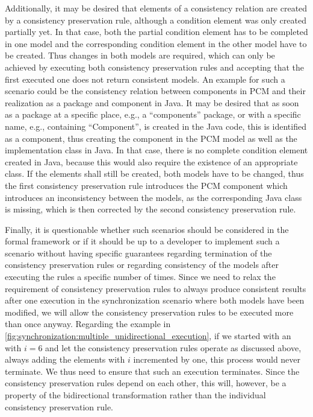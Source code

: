 Additionally, it may be desired that elements of a consistency relation are created by a consistency preservation rule, although a condition element was only created partially yet.
In that case, both the partial condition element has to be completed in one model and the corresponding condition element in the other model have to be created.
Thus changes in both models are required, which can only be achieved by executing both consistency preservation rules and accepting that the first executed one does not return consistent models.
An example for such a scenario could be the consistency relation between components in \gls{PCM} and their realization as a package and component in Java.
It may be desired that as soon as a package at a specific place, e.g., a \enquote{components} package, or with a specific name, e.g., containing \enquote{Component}, is created in the Java code, this is identified as a component, thus creating the component in the \gls{PCM} model as well as the implementation class in Java.
In that case, there is no complete condition element created in Java, because this would also require the existence of an appropriate class.
If the elements shall still be created, both models have to be changed, thus the first consistency preservation rule introduces the \gls{PCM} component which introduces an inconsistency between the models, as the corresponding Java class is missing, which is then corrected by the second consistency preservation rule.

Finally, it is questionable whether such scenarios should be considered in the formal framework or if it should be up to a developer to implement such a scenario without having specific guarantees regarding termination of the consistency preservation rules or regarding consistency of the models after executing the rules a specific number of times.
Since we need to relax the requirement of consistency preservation rules to always produce consistent results after one execution in the synchronization scenario where both models have been modified, we will allow the consistency preservation rules to be executed more than once anyway.
Regarding the example in \autoref{fig:synchronization:multiple_unidirectional_execution}, if we started with an  with $i = 6$ and let the consistency preservation rules operate as discussed above, always adding the elements with $i$ incremented by one, this process would never terminate.
We thus need to ensure that such an execution terminates.
Since the consistency preservation rules depend on each other, this will, however, be a property of the bidirectional transformation rather than the individual consistency preservation rule.

